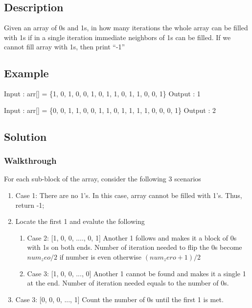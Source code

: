 \documentclass[]{book}
\begin{document}
\hypertarget{description-24}{%
\subsection{Description}\label{description-24}}

Given an array of 0s and 1s, in how many iterations the whole array can be filled with 1s if in a single iteration
immediate neighbors of 1s can be filled. If we cannot fill array with 1s, then print ``-1''

\hypertarget{example-23}{%
\subsection{Example}\label{example-23}}

Input : arr{[}{]} = \{1, 0, 1, 0, 0, 1, 0, 1, 1, 0, 1, 1, 0, 0, 1\}
Output : 1

Input : arr{[}{]} = \{0, 0, 1, 1, 0, 0, 1, 1, 0, 1, 1, 1, 1, 0, 0, 0, 1\}
Output : 2

\hypertarget{solution-18}{%
\subsection{Solution}\label{solution-18}}

\hypertarget{walkthrough-22}{%
\subsubsection{Walkthrough}\label{walkthrough-22}}

For each sub-block of the array, consider the following 3 scenarios

\begin{enumerate}
    \item Case 1: There are no 1's. In this case, array cannot be filled with 1's. Thus, return -1;
    \item Locate the first 1 and evalute the following
        \begin{enumerate}
            \item Case 2: [1, 0, 0, ...., 0, 1] Another 1 follows and makes it a block of 0s with 1s on both ends. Number of iteration needed
to flip the 0s become $num_zeo / 2$ if number is even otherwise $(num_zero + 1) / 2$
            \item Case 3: [1, 0, 0, ..., 0] Another 1 cannot be found and makes it a single 1 at the end. Number of iteration needed equals
to the number of 0s.
        \end{enumerate}
    \item Case 3: [0, 0, 0, ..., 1] Count the number of 0s until the first 1 is met.
\end{enumerate}
\end{document}
